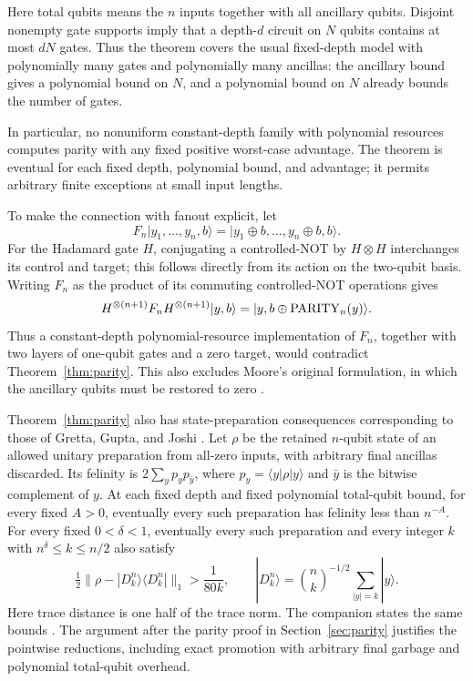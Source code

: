 Here total qubits means the $n$ inputs together with all ancillary
qubits. Disjoint nonempty gate supports imply that a depth-$d$ circuit
on $N$ qubits contains at most $dN$ gates. Thus the theorem covers the
usual fixed-depth model with polynomially many gates and polynomially
many ancillas: the ancillary bound gives a polynomial bound on $N$,
and a polynomial bound on $N$ already bounds the number of gates.

In particular, no nonuniform constant-depth family with polynomial
resources computes parity with any fixed positive worst-case advantage.
The theorem is eventual for each fixed depth, polynomial bound, and advantage;
it permits arbitrary finite exceptions at small input lengths.

To make the connection with fanout explicit, let
\[
 F_n\lvert y_1,\ldots,y_n,b\rangle
 =\lvert y_1\mathbin{\oplus}b,\ldots,
          y_n\mathbin{\oplus}b,b\rangle.
\]
For the Hadamard gate $H$, conjugating a controlled-NOT by
$H\otimes H$ interchanges its control and target; this follows
directly from its action on the two-qubit basis. Writing $F_n$
as the product of its commuting controlled-NOT operations gives
\[
 H^{\otimes(n+1)}F_nH^{\otimes(n+1)}
 \lvert y,b\rangle
 =\lvert y,b\mathbin{\oplus}\mathrm{PARITY}_n(y)\rangle.
\]
Thus a constant-depth polynomial-resource implementation of
$F_n$, together with two layers of one-qubit gates and a zero
target, would contradict Theorem~\ref{thm:parity}. This also
excludes Moore's original formulation, in which the ancillary
qubits must be restored to zero \citep{Moore1999}.

Theorem~\ref{thm:parity} also has state-preparation consequences
corresponding to those of Gretta, Gupta, and Joshi
\citep[Corollary~4.10 and Theorem~4.14]{GGJ2026Fourier}.
Let $\rho$ be the retained $n$-qubit state of an allowed unitary
preparation from all-zero inputs, with arbitrary final ancillas discarded.
Its felinity is $2\sum_y p_y p_{\bar y}$, where
$p_y=\langle y|\rho|y\rangle$ and $\bar y$ is the bitwise complement of $y$.
At each fixed depth and fixed polynomial total-qubit bound, for every fixed
$A>0$, eventually every such preparation has felinity less than $n^{-A}$.
For every fixed $0<\delta<1$, eventually every such preparation and every
integer $k$ with $n^\delta\le k\le n/2$ also satisfy
\[
 \tfrac12\bigl\|\rho-|D_k^n\rangle\langle D_k^n|\bigr\|_1
 >\frac1{80k},
 \qquad
 |D_k^n\rangle=\binom nk^{-1/2}\sum_{|y|=k}|y\rangle.
\]
Here trace distance is one half of the trace norm. The companion states
the same bounds
\citep[Corollary~8 (State-preparation obstructions), Section~7.1]{OpenAILocalization2026}.
The argument after the parity proof in Section~\ref{sec:parity}
justifies the pointwise reductions, including exact promotion with
arbitrary final garbage and polynomial total-qubit overhead.

